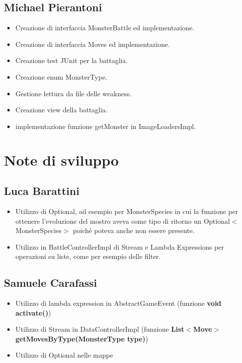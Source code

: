 \subsection*{Michael Pierantoni}
\begin{itemize}
    \item Creazione di interfaccia MonsterBattle ed implementazione.
    \item Creazione di interfaccia Moves ed implementazione.
    \item Creazione test JUnit per la battaglia.
    \item Creazione enum MonsterType.
    \item Gestione lettura da file delle weakness.
    \item Creazione view della battaglia.
    \item implementazione funzione getMonster in ImageLoadersImpl.
\end{itemize}

\section{Note di sviluppo}

\subsection*{Luca Barattini}
\begin{itemize}
    \item Utilizzo di Optional, ad esempio per MonsterSpecies in cui la funzione per ottenere l'evoluzione del mostro aveva come tipo di ritorno un Optional$<$MonsterSpecies$>$ poiché poteva anche non essere presente.
    \item Utilizzo in BattleControllerImpl di Stream e Lambda Expressions per operazioni su liste, come per esempio delle filter. 
\end{itemize}


\subsection*{Samuele Carafassi}
\begin{itemize}
    \item Utilizzo di lambda expression in AbstractGameEvent (funzione \textbf{void activate()})
    \item Utilizzo di Stream in DataControllerImpl (funzione \textbf{List$<$Move$>$ getMovesByType(MonsterType type)})
    \item Utilizzo di Optional nelle mappe
\end{itemize}
